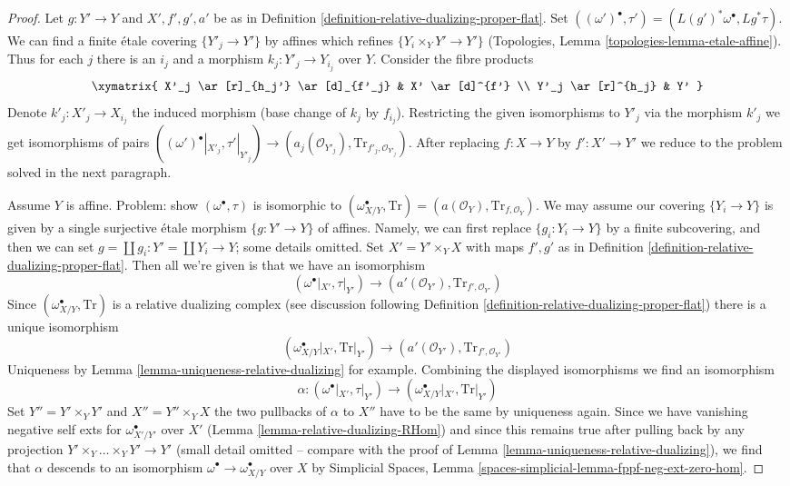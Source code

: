 \begin{proof}
Let $g : Y' \to Y$ and $X', f', g', a'$ be as in
Definition \ref{definition-relative-dualizing-proper-flat}.
Set $((\omega')^\bullet, \tau') = (L(g')^*\omega^\bullet, Lg^*\tau)$.
We can find a finite \'etale covering
$\{Y'_j \to Y'\}$ by affines which refines $\{Y_i \times_Y Y' \to Y'\}$
(Topologies, Lemma \ref{topologies-lemma-etale-affine}).
Thus for each $j$ there is an $i_j$ and a morphism
$k_j : Y'_j \to Y_{i_j}$ over $Y$. Consider the fibre products
$$
\xymatrix{
X'_j \ar[r]_{h_j'} \ar[d]_{f'_j} &
X' \ar[d]^{f'} \\
Y'_j \ar[r]^{h_j} & Y'
}
$$
Denote $k'_j : X'_j \to X_{i_j}$ the induced morphism (base change
of $k_j$ by $f_{i_j}$). Restricting the given isomorphisms to $Y'_j$
via the morphism $k'_j$ we get isomorphisms of pairs
$((\omega')^\bullet|_{X'_j}, \tau'|_{Y'_j})
\to (a_j(\mathcal{O}_{Y'_j}), \text{Tr}_{f'_j, \mathcal{O}_{Y'_j}})$.
After replacing $f : X \to Y$ by $f' : X' \to Y'$ we reduce to the
problem solved in the next paragraph.

\medskip\noindent
Assume $Y$ is affine. Problem: show $(\omega^\bullet, \tau)$ is
isomorphic to $(\omega_{X/Y}^\bullet, \text{Tr}) =
(a(\mathcal{O}_Y), \text{Tr}_{f, \mathcal{O}_Y})$.
We may assume our covering $\{Y_i \to Y\}$ is given by a single
surjective \'etale morphism $\{g : Y' \to Y\}$ of affines.
Namely, we can first replace $\{g_i: Y_i \to Y\}$ by a finite
subcovering, and then we can set $g = \coprod g_i :  Y' = \coprod Y_i \to Y$;
some details omitted. Set $X' = Y' \times_Y X$ with maps
$f', g'$ as in Definition \ref{definition-relative-dualizing-proper-flat}.
Then all we're given is that we have an isomorphism
$$
(\omega^\bullet|_{X'}, \tau|_{Y'}) \to
(a'(\mathcal{O}_{Y'}), \text{Tr}_{f', \mathcal{O}_{Y'}})
$$
Since $(\omega_{X/Y}^\bullet, \text{Tr})$ is a relative dualizing complex
(see discussion following
Definition \ref{definition-relative-dualizing-proper-flat})
there is a unique isomorphism
$$
(\omega_{X/Y}^\bullet|_{X'}, \text{Tr}|_{Y'}) \to
(a'(\mathcal{O}_{Y'}), \text{Tr}_{f', \mathcal{O}_{Y'}})
$$
Uniqueness by Lemma \ref{lemma-uniqueness-relative-dualizing} for example.
Combining the displayed isomorphisms we find an isomorphism
$$
\alpha :
(\omega^\bullet|_{X'}, \tau|_{Y'}) \to
(\omega_{X/Y}^\bullet|_{X'}, \text{Tr}|_{Y'})
$$
Set $Y'' = Y' \times_Y Y'$ and $X'' = Y'' \times_Y X$ the two
pullbacks of $\alpha$ to $X''$ have to be the same by uniqueness again.
Since we have vanishing negative self exts for
$\omega_{X'/Y'}^\bullet$ over $X'$ (Lemma \ref{lemma-relative-dualizing-RHom})
and since this remains true after pulling back by any projection
$Y' \times_Y \ldots \times_Y Y' \to Y'$ (small detail omitted -- compare
with the proof of Lemma \ref{lemma-uniqueness-relative-dualizing}),
we find that $\alpha$ descends to an isomorphism
$\omega^\bullet \to \omega_{X/Y}^\bullet$
over $X$ by Simplicial Spaces, Lemma
\ref{spaces-simplicial-lemma-fppf-neg-ext-zero-hom}.
\end{proof}

